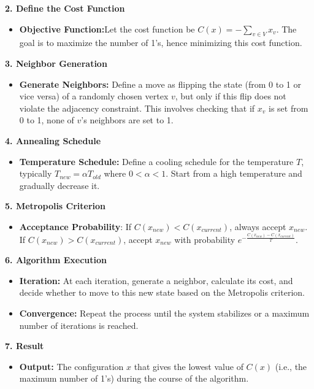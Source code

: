 \documentclass[8pt]{article}
\begin{document}
\textbf{2. Define the Cost Function}
\begin{itemize}
    \item \textbf{Objective Function:}Let the cost function be \( C(x) = -\sum_{v \in V} x_v \). The goal is to maximize the number of 1's, hence minimizing this cost function.
\end{itemize}

\textbf{3. Neighbor Generation}
\begin{itemize}
    \item \textbf{Generate Neighbors:} Define a move as flipping the state (from 0 to 1 or vice versa) of a randomly chosen vertex \( v \), but only if this flip does not violate the adjacency constraint. This involves checking that if \( x_v \) is set from 0 to 1, none of \( v \)'s neighbors are set to 1.
\end{itemize}

\textbf{4. Annealing Schedule}
\begin{itemize}
    \item \textbf{Temperature Schedule:} Define a cooling schedule for the temperature \( T \), typically \( T_{new} = \alpha T_{old} \) where \( 0 < \alpha < 1 \). Start from a high temperature and gradually decrease it.
\end{itemize}

\textbf{5. Metropolis Criterion}
\begin{itemize}
    \item \textbf{Acceptance Probability}: If \( C(x_{new}) < C(x_{current}) \), always accept \( x_{new} \). If \( C(x_{new}) > C(x_{current}) \), accept \( x_{new} \) with probability \( e^{-\frac{C(x_{new}) - C(x_{current})}{T}} \).
\end{itemize}

\textbf{6. Algorithm Execution}
\begin{itemize}
    \item \textbf{ Iteration:} At each iteration, generate a neighbor, calculate its cost, and decide whether to move to this new state based on the Metropolis criterion.
    \item \textbf{Convergence:} Repeat the process until the system stabilizes or a maximum number of iterations is reached.
\end{itemize}

\textbf{7. Result}
\begin{itemize}
    \item \textbf{Output:} The configuration \( x \) that gives the lowest value of \( C(x) \) (i.e., the maximum number of 1's) during the course of the algorithm.
\end{itemize}
\end{document}
